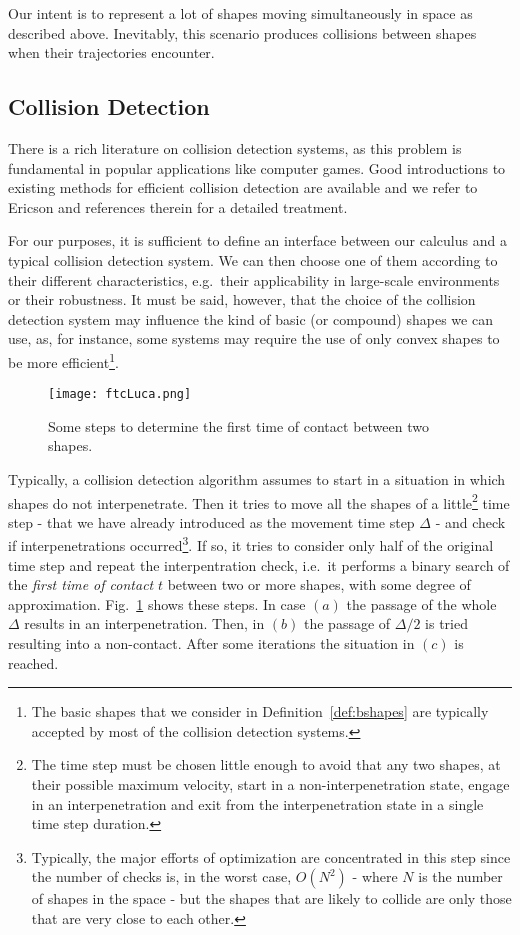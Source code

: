 \documentclass[11pt]{article}
\newcommand{\mts}{\Delta}
\begin{document}
Our intent is to represent a lot of shapes moving simultaneously in space as described above.
Inevitably, this scenario produces collisions between shapes when their trajectories encounter.

\subsection{Collision Detection}
\label{sec:collisiondetection}
There is a rich literature on collision detection systems, as this problem is fundamental in popular applications like computer games. Good introductions to existing methods for efficient collision detection are available and we refer to Ericson \cite{Ericson2005} and references therein for a detailed treatment.

For our purposes, it is sufficient to define an interface between our calculus and a typical collision detection system. We can then choose one of them according to their different characteristics, e.g.\ their applicability in large-scale environments or their robustness. It must be said, however, that the choice of the collision detection system may influence the kind of basic (or compound) shapes we can use, as, for instance, some systems may require the use of only convex shapes to be more efficient\footnote{The basic shapes that we consider in Definition~\ref{def:bshapes} are typically accepted by most of the collision detection systems.}.

\begin{figure}
\begin{center}
\texttt{[image: ftcLuca.png]}
\end{center}
\caption{Some steps to determine the first time of contact between two shapes.}
\label{fig:ftc}
\end{figure}

Typically, a collision detection algorithm assumes to start in a situation in which shapes do not interpenetrate. Then it tries to move all the shapes of a little\footnote{The time step must be chosen little enough to avoid that any two shapes, at their possible maximum velocity, start in a non-interpenetration state, engage in an interpenetration and exit from the interpenetration state in a single time step duration.} time step - that we have already introduced as the movement time step $\mts$ - and check if interpenetrations occurred\footnote{Typically, the major efforts of optimization are concentrated in this step since the number of checks is, in the worst case, $O(N^2)$ - where $N$ is the number of shapes in the space - but the shapes that are likely to collide are only those that are very close to each other.}. If so, it tries to consider only half of the original time step and repeat the interpentration check, i.e.\ it performs a binary search of the \emph{first time of contact} $t$ between two or more shapes, with some degree of approximation. Fig.~\ref{fig:ftc} shows these steps. In case $(a)$ the passage of the whole $\mts$ results in an interpenetration. Then, in $(b)$ the passage of $\mts/2$ is tried resulting into a non-contact. After some iterations the situation in $(c)$ is reached.
\end{document}
